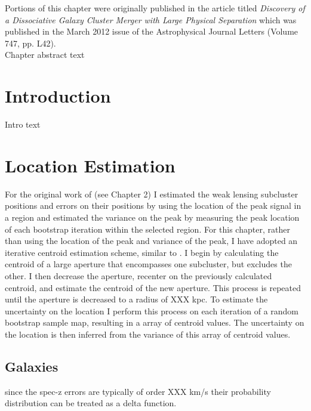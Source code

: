 \label{chapter:4}

\noindent Portions of this chapter were originally published in the article titled \emph{Discovery of a Dissociative Galaxy Cluster Merger with Large Physical Separation} which was published in the March 2012 issue of the Astrophysical Journal Letters (Volume 747, pp. L42). \\

Chapter abstract text

\section{Introduction}



Intro text \citep{Dawson:2012dl}

\section{Location Estimation}
For the original work of \citet{Dawson:2012dl} (see Chapter 2) I estimated the weak lensing subcluster positions and errors on their positions by using the location of the peak signal in a region and estimated the variance on the peak by measuring the peak location of each bootstrap iteration within the selected region.  
For this chapter, rather than using the location of the peak and variance of the peak, I have adopted an iterative centroid estimation scheme, similar to \citet{Randall:2008hs}. 
I begin by calculating the centroid of a large aperture that encompasses one subcluster, but excludes the other.
I then decrease the aperture, recenter on the previously calculated centroid, and estimate the centroid of the new aperture.
This process is repeated until the aperture is decreased to a radius of XXX kpc.
To estimate the uncertainty on the location I perform this process on each iteration of a random bootstrap sample map, resulting in a array of centroid values.
 The uncertainty on the location is then inferred from the variance of this array of centroid values.


\subsection{Galaxies}

since the spec-z errors are typically of order XXX km/s their probability distribution can be treated as a delta function.

